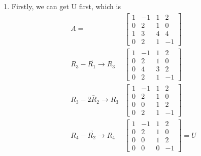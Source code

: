 \documentclass{article}
\begin{document}




\begin{enumerate}
\item

Firstly, we can get U first, which is \begin{align*}
A=&\begin{bmatrix}
1&-1&1&2\\0&2&1&0\\1&3&4&4\\0&2&1&-1
\end{bmatrix}\\
\underrightarrow{R_3-R_1\rightarrow R_3}&\begin{bmatrix}
1&-1&1&2\\0&2&1&0\\0&4&3&2\\0&2&1&-1
\end{bmatrix}\\
\underrightarrow{R_3-2R_2\rightarrow R_3}&\begin{bmatrix}
1&-1&1&2\\0&2&1&0\\0&0&1&2\\0&2&1&-1
\end{bmatrix}\\
\underrightarrow{R_4-R_2\rightarrow R_4}&\begin{bmatrix}
1&-1&1&2\\0&2&1&0\\0&0&1&2\\0&0&0&-1
\end{bmatrix}=U\\
\end{align*}


\end{enumerate}
\end{document}
